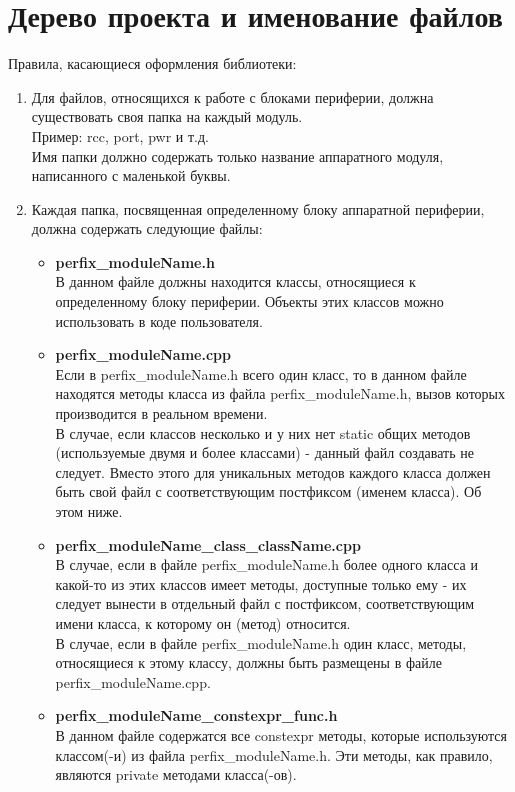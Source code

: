 \section{Дерево проекта и именование файлов}
\label{dn:0}
Правила, касающиеся оформления библиотеки:
\begin{enumerate}
	\item Для файлов, относящихся к работе с блоками периферии, должна существовать своя папка на каждый модуль.\\
	Пример: rcc, port, pwr и т.д.\\
	Имя папки должно содержать только название аппаратного модуля, написанного с маленькой буквы.\\
	\item Каждая папка, посвященная определенному блоку аппаратной периферии, должна содержать следующие файлы:
	\begin{itemize}
		\item \textbf{perfix\_moduleName.h}\\
		В данном файле должны находится классы, относящиеся к определенному блоку периферии. Объекты этих классов можно использовать в коде пользователя.
		\item \textbf{perfix\_moduleName.cpp}\\
		Если в perfix\_moduleName.h всего один класс, то в данном файле находятся методы класса из файла perfix\_moduleName.h, вызов которых производится в реальном времени.\\
		В случае, если классов несколько и у них нет static общих методов (используемые двумя и более классами) - данный файл создавать не следует. Вместо этого для уникальных методов каждого класса должен быть свой файл с соответствующим постфиксом (именем класса). Об этом ниже.
		\item \textbf{perfix\_moduleName\_class\_className.cpp}\\
		В случае, если в файле perfix\_moduleName.h более одного класса и какой-то из этих классов имеет методы, доступные только ему - их следует вынести в отдельный файл с постфиксом, соответствующим имени класса, к которому он (метод) относится.\\
		В случае, если в файле perfix\_moduleName.h один класс, методы, относящиеся к этому классу, должны быть размещены в файле perfix\_\-moduleName.cpp.
		\item \textbf{perfix\_moduleName\_constexpr\_func.h}\\
		В данном файле содержатся все constexpr методы, которые используются классом(-и) из файла perfix\_moduleName.h. Эти методы, как правило, являются private методами класса(-ов).\\

\end{itemize}
\end{enumerate}
